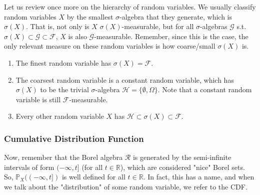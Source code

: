 \documentclass{article}
\begin{document}
    Let us review once more on the hierarchy of random variables. We usually classify random variables $X$ by the smallest $\sigma$-algebra that they generate, which is $\sigma(X)$. That is, not only is $X$ $\sigma(X)$-measurable, but for all $\sigma$-algebras $\mathcal{G}$ s.t. $\sigma(X) \subset \mathcal{G} \subset \mathcal{F}$, $X$ is also $\mathcal{G}$-measurable. Remember, since this is the case, the only relevant measure on these random variables is how coarse/small $\sigma(X)$ is. 
    \begin{enumerate}
      \item The finest random variable has $\sigma(X) = \mathcal{F}$. 
      
      \item The coarsest random variable is a constant random variable, which has $\sigma(X)$ to be the trivial $\sigma$-algebra $\mathcal{H} = \{\emptyset, \Omega\}$. Note that a constant random variable is still $\mathcal{F}$-measurable. 
      
      \item Every other random variable $X$ has $\mathcal{H} \subset \sigma(X) \subset \mathcal{F}$. 
    \end{enumerate}

    \subsubsection{Cumulative Distribution Function}

      Now, remember that the Borel algebra $\mathcal{R}$ is generated by the semi-infinite intervals of form $(-\infty, t]$ (for all $t \in \mathbb{R}$), which are considered "nice" Borel sets. So, $\mathbb{P}_X( (-\infty, t])$ is well defined for all $t \in \mathbb{R}$. In fact, this has a name, and when we talk about the "distribution" of some random variable, we refer to the CDF. 
\end{document}
